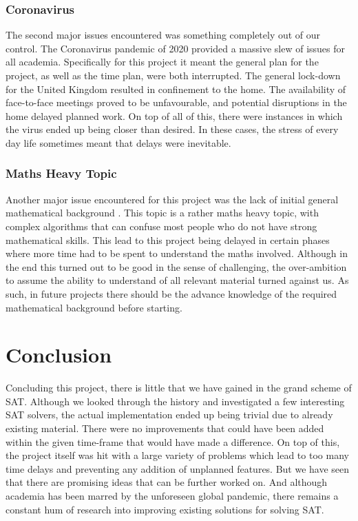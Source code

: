 \documentclass{article}
\begin{document}
\subsubsection{Coronavirus}
The second major issues encountered was something completely out of our control. The Coronavirus pandemic of 2020 provided a
massive slew of issues for all academia. Specifically for this project it meant the general plan for the project, as well as the
time plan, were both interrupted. The general lock-down for the United Kingdom resulted in confinement to the home. The
availability of face-to-face meetings proved to be unfavourable, and potential disruptions in the home delayed planned work. On
top of all of this, there were instances in which the virus ended up being closer than desired. In these cases, the stress of
every day life sometimes meant that delays were inevitable.

\subsubsection{Maths Heavy Topic}
Another major issue encountered for this project was the lack of initial general mathematical background . This topic is a rather
maths heavy topic, with complex algorithms that can confuse most people who do not have strong mathematical skills. This lead to
this project being delayed in certain phases where more time had to be spent to understand the maths involved. Although in the end
this turned out to be good in the sense of challenging, the over-ambition to assume the ability to understand of all relevant
material turned against us. As such, in future projects there should be the advance knowledge of the required mathematical
background before starting.

\section{Conclusion}
Concluding this project, there is little that we have gained in the grand scheme of SAT. Although we looked through the history
and investigated a few interesting SAT solvers, the actual implementation ended up being trivial due to already existing material.
There were no improvements that could have been added within the given time-frame that would have made a difference. On top of
this, the project itself was hit with a large variety of problems which lead to too many time delays and preventing any addition
of unplanned features. But we have seen that there are promising ideas that can be further worked on. And although academia has
been marred by the unforeseen global pandemic, there remains a constant hum of research into improving existing solutions for
solving SAT.

\newpage


\end{document}
